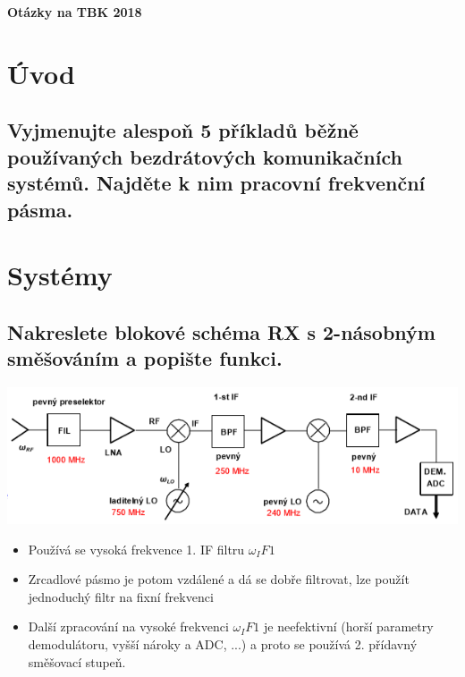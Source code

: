 \documentclass[a4paper,czech]{article}
\begin{document}
\LARGE{\textbf{Otázky na TBK 2018}}
\newpage
\section{Úvod}
\subsection{\textbf{Vyjmenujte alespoň 5 příkladů běžně používaných bezdrátových komunikačních systémů. Najděte k nim pracovní frekvenční pásma.}}

\section{Systémy}
\subsection{\textbf{Nakreslete blokové schéma RX s 2-násobným směšováním a popište funkci.}}
\includegraphics{images/rx_2_nasobny.png}
\begin{itemize}
	\item Používá se vysoká frekvence 1. IF filtru $\omega_IF1$
	\item Zrcadlové pásmo je potom vzdálené a dá se dobře filtrovat, lze použít jednoduchý filtr na fixní frekvenci
	\item Další zpracování na vysoké frekvenci $\omega_IF1$ je neefektivní (horší parametry demodulátoru, vyšší nároky a ADC, ...) a proto se používá 2. přídavný směšovací stupeň.
\end{itemize}
\end{document}

